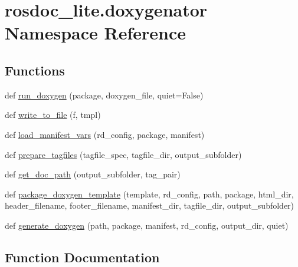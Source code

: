 \hypertarget{namespacerosdoc__lite_1_1doxygenator}{}\section{rosdoc\+\_\+lite.\+doxygenator Namespace Reference}
\label{namespacerosdoc__lite_1_1doxygenator}
\subsection*{Functions}
\begin{DoxyCompactItemize}
\item 
def \hyperlink{namespacerosdoc__lite_1_1doxygenator_a88b79a33e98bd84fc84294b09f58255a}{run\+\_\+doxygen} (package, doxygen\+\_\+file, quiet=False)
\item 
def \hyperlink{namespacerosdoc__lite_1_1doxygenator_ac4fd4990b71ec3d49d1639ef63bd0630}{write\+\_\+to\+\_\+file} (f, tmpl)
\item 
def \hyperlink{namespacerosdoc__lite_1_1doxygenator_ae886aaa38bf22f9047d23714844fdd8a}{load\+\_\+manifest\+\_\+vars} (rd\+\_\+config, package, manifest)
\item 
def \hyperlink{namespacerosdoc__lite_1_1doxygenator_a5ecf197ace49e2afdf49128d293739d8}{prepare\+\_\+tagfiles} (tagfile\+\_\+spec, tagfile\+\_\+dir, output\+\_\+subfolder)
\item 
def \hyperlink{namespacerosdoc__lite_1_1doxygenator_ac92aa7c3531b0bf1eb0c9a8b79f9120d}{get\+\_\+doc\+\_\+path} (output\+\_\+subfolder, tag\+\_\+pair)
\item 
def \hyperlink{namespacerosdoc__lite_1_1doxygenator_a44516376cf38c9526e0ecab0f4d41ea5}{package\+\_\+doxygen\+\_\+template} (template, rd\+\_\+config, path, package, html\+\_\+dir, header\+\_\+filename, footer\+\_\+filename, manifest\+\_\+dir, tagfile\+\_\+dir, output\+\_\+subfolder)
\item 
def \hyperlink{namespacerosdoc__lite_1_1doxygenator_ac427e2c0d453f939d7a5fe911b3189fd}{generate\+\_\+doxygen} (path, package, manifest, rd\+\_\+config, output\+\_\+dir, quiet)
\end{DoxyCompactItemize}


\subsection{Function Documentation}
